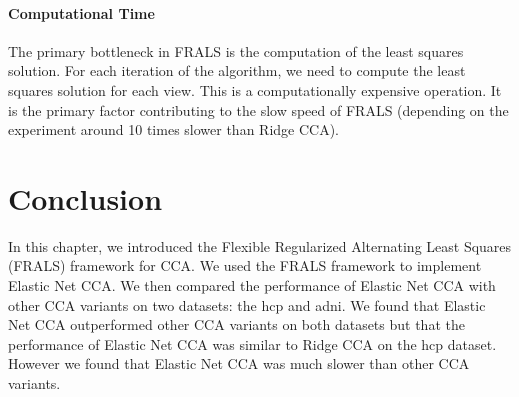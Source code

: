 \paragraph{Computational Time}\label{subsec:computational-time}

The primary bottleneck in FRALS is the computation of the least squares solution.
For each iteration of the algorithm, we need to compute the least squares solution for each view.
This is a computationally expensive operation.
It is the primary factor contributing to the slow speed of FRALS (depending on the experiment around 10 times slower than Ridge CCA).

\section{Conclusion}\label{sec:conclusion}

In this chapter, we introduced the Flexible Regularized Alternating Least Squares (FRALS) framework for CCA\@.
We used the FRALS framework to implement Elastic Net CCA\@.
We then compared the performance of Elastic Net CCA with other CCA variants on two datasets: the \acrshort{hcp} and \acrshort{adni}.
We found that Elastic Net CCA outperformed other CCA variants on both datasets but that the performance of Elastic Net CCA was similar to Ridge CCA on the \acrshort{hcp} dataset.
However we found that Elastic Net CCA was much slower than other CCA variants.
